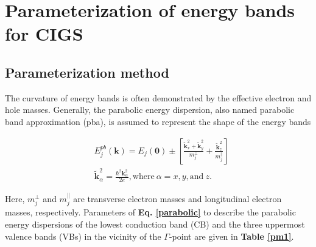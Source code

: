 \documentclass[a4paper, 12pt, titlepage,oneside,drop]{kthesis}
\begin{document}
\section{Parameterization of energy bands for CIGS}

\subsection{Parameterization method}
The curvature of energy bands is often demonstrated by the effective electron and hole masses. Generally, the parabolic energy dispersion, also named parabolic band approximation (pba),
is assumed to represent the shape of the energy bands

\begin{equation}\begin{split}\label{parabolic}
& E_{j}^{pb}(\textbf{k}) = E_{j}(\textbf{0}) \pm \left[ \frac{\widetilde{\textbf{k}}_{x}^{2}+\widetilde{ \textbf{k}}_{y}^{2}}{m_{j}^{\perp}} + \frac{\widetilde{\textbf{k}}_{z}^{2}}{m_{j}^{\parallel}} \right] \\
& \widetilde{\textbf{k}}_{\alpha}^{2} = \frac{\hbar^2 {\textbf{k}}_{\alpha}^{2}}{2e}, \textrm{where}\  \alpha = x, y, \textrm{and}\  z.
\end{split}
\end{equation}

Here, $m_{j}^{\perp}$ and $m_{j}^{\parallel}$ are transverse electron masses and longitudinal electron masses, respectively. Parameters of \textbf{Eq. \ref{parabolic}} to describe the parabolic energy dispersions of the lowest
conduction band (CB) and the three uppermost valence bands (VBs) in the vicinity of the $\Gamma$-point are given in \textbf{Table \ref{pm1}}.

\begin{table}[H]
\centering
 \captionsetup{width=1\textwidth}
\caption {Parameters of \textbf{Eq. \ref{parabolic}} for {CuInSe\textsubscript{2}}, {CuIn\textsubscript{0.5}Ga\textsubscript{0.5}Se\textsubscript{2}}, and {CuGaSe\textsubscript{2}}. $E_{v1}(\textbf{0})$ is the valence band maximum (VBM) and $E_{c1}(\textbf{0})$ is the fundamental band-gap energy $E_g$.}\label{pm1}
\end{table}
\end{document}
